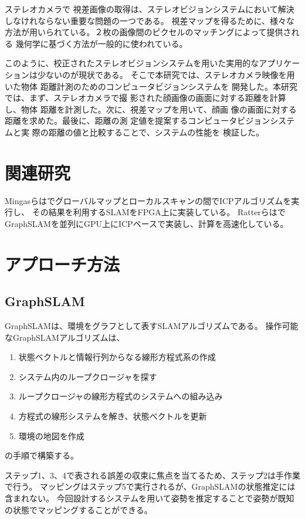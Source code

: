 \documentclass{jsarticle}
\begin{document}
ステレオカメラで
視差画像の取得は、ステレオビジョンシステムにおいて解決しなけれならない重要な問題の一つである。
視差マップを得るために、様々な方法が用いられている。２枚の画像間のピクセルのマッチングによって提供される
幾何学に基づく方法が一般的に使われている。

このように、校正されたステレオビジョンシステムを用いた実用的なアプリケーションは少ないのが現状である。
そこで本研究では、ステレオカメラ映像を用いた物体
距離計測のためのコンピュータビジョンシステムを
開発した。本研究では、まず、ステレオカメラで撮
影された顔画像の画面に対する距離を計算し、物体
距離を計測した。次に、視差マップを用いて、顔画
像の画面に対する距離を求めた。最後に、距離の測
定値を提案するコンピュータビジョンシステムと実
際の距離の値と比較することで、システムの性能を
検証した。

\section{関連研究}
Mingasらは\cite{Mingas2012}でグローバルマップとローカルスキャンの間でICPアルゴリズムを実行し、
その結果を利用するSLAMをFPGA上に実装している。
Ratterらは\cite{Ratter2013}でGraphSLAMを並列にGPU上にICPベースで実装し、計算を高速化している。

\section{アプローチ方法}\label{sec:approach}
\subsection{GraphSLAM}
GraphSLAMは、環境をグラフとして表すSLAMアルゴリズムである。
操作可能なGraphSLAMアルゴリズムは、
\begin{enumerate}
    \item 状態ベクトルと情報行列からなる線形方程式系の作成
    \item システム内のループクロージャを探す
    \item ループクロージャの線形方程式のシステムへの組み込み
    \item 方程式の線形システムを解き、状態ベクトルを更新
    \item 環境の地図を作成
\end{enumerate}
の手順で構築する。

ステップ1、3、4で表される誤差の収束に焦点を当てるため、ステップ2は手作業で行う。
マッピングはステップ5で実行されるが、GraphSLAMの状態推定には含まれない。
今回設計するシステムを用いて姿勢を推定することで姿勢が既知の状態でマッピングすることができる。
\end{document}
